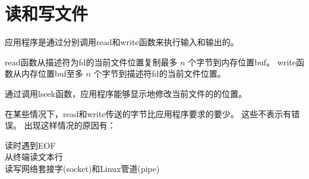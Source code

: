 
\section{读和写文件}
{
    应用程序是通过分别调用read和write函数来执行输入和输出的。

    read函数从描述符为fd的当前文件位置复制最多 $n$ 个字节到内存位置buf。
    write函数从内存位置buf至多 $n$ 个字节到描述符fd的当前文件位置。

    通过调用lseek函数，应用程序能够显示地修改当前文件的的位置。

    在某些情况下，read和write传送的字节比应用程序要求的要少。
    这些不表示有错误。
    出现这样情况的原因有：

    \begin{description}
        \item[读时遇到EOF]
        \item[从终端读文本行]
        \item[读写网络套接字(socket)和Linux管道(pipe)]
    \end{description}
}
